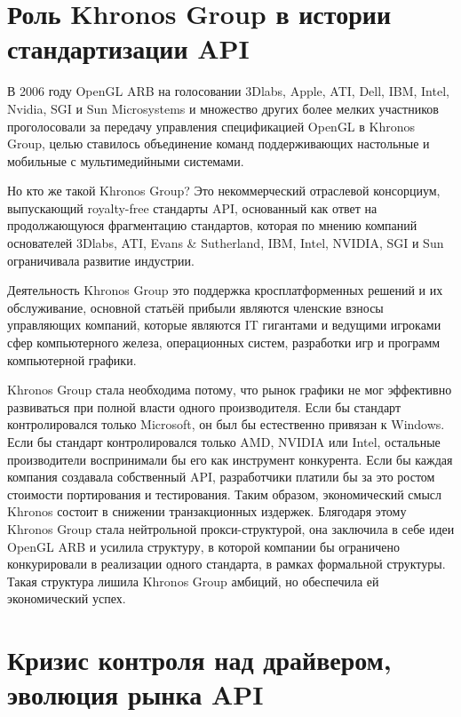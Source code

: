 \documentclass[12pt,a4paper]{article}
\begin{document}
\section{Роль Khronos Group в истории стандартизации API}

В 2006 году OpenGL ARB на голосовании 3Dlabs, Apple, ATI, Dell, IBM, Intel, Nvidia, SGI и 
Sun Microsystems и множество других более мелких участников проголосовали за передачу 
управления спецификацией OpenGL в Khronos Group, целью ставилось объединение команд
поддерживающих настольные и мобильные с мультимедийными системами.

Но кто же такой Khronos Group? Это некоммерческий отраслевой консорциум, выпускающий 
royalty-free стандарты API, основанный как ответ на продолжающуюся фрагментацию 
стандартов, которая по мнению компаний основателей 3Dlabs, ATI, Evans \& Sutherland, IBM, 
Intel, NVIDIA, SGI и Sun ограничивала развитие индустрии.

Деятельность Khronos Group это поддержка кросплатформенных решений и их обслуживание,
основной статьёй прибыли являются членские взносы управляющих компаний, которые являются
IT гигантами и ведущими игроками сфер компьютерного железа, операционных систем,
разработки игр и программ компьютерной графики.

Khronos Group стала необходима потому, что рынок графики не мог эффективно развиваться 
при полной власти одного производителя. Если бы стандарт контролировался
только Microsoft, он был бы естественно привязан к Windows. Если бы стандарт контролировался 
только AMD, NVIDIA или Intel, остальные производители воспринимали бы
его как инструмент конкурента. Если бы каждая компания создавала собственный API,
разработчики платили бы за это ростом стоимости портирования и тестирования. Таким образом, 
экономический смысл Khronos состоит в снижении транзакционных издержек. 
Блягодаря этому Khronos Group стала нейтрольной прокси-структурой, она заключила в себе идеи 
OpenGL ARB и усилила структуру, в которой компании бы ограничено конкурировали в реализации 
одного стандарта, в рамках формальной структуры. Такая структура лишила Khronos Group 
амбиций, но обеспечила ей экономический успех. 

\section{Кризис контроля над драйвером, эволюция рынка API}


\end{document}
